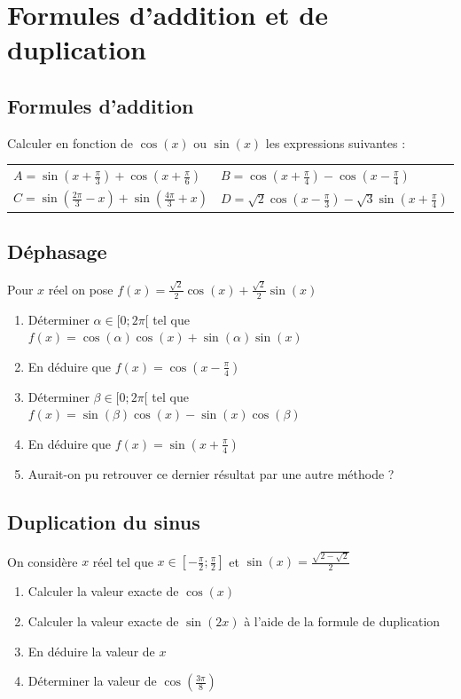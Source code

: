 \documentclass[oneside,12pt]{article}          %
\begin{document}
\section{Formules d'addition et de duplication}

\subsection{Formules d'addition}
Calculer en fonction de $\cos(x)$ ou $\sin(x)$ les expressions suivantes :

\begin{tabular}{p{} p{}}
	$A=\sin(x+\frac{\pi}{3})+\cos(x+\frac{\pi}{6})$ & $B=\cos(x+\frac{\pi}{4})-\cos(x-\frac{\pi}{4})$ \\
	$C=\sin(\frac{2\pi}{3}-x)+\sin(\frac{4\pi}{3}+x)$ & $D=\sqrt{2}\cos(x-\frac{\pi}{3})-\sqrt{3}\sin(x+\frac{\pi}{4})$
\end{tabular}



\subsection{Déphasage}
Pour $x$ réel on pose $f(x)=\frac{\sqrt{2}}{2}\cos(x)+\frac{\sqrt{2}}{2}\sin(x)$
\begin{enumerate}
	\item Déterminer $\alpha\in[0;2\pi[$ tel que $f(x)=\cos(\alpha)\cos(x)+\sin(\alpha)\sin(x)$
	\item En déduire que $f(x)=\cos\left(x-\frac{\pi}{4}\right)$
	\item Déterminer $\beta\in[0;2\pi[$ tel que $f(x)=\sin(\beta)\cos(x)-\sin(x)\cos(\beta)$
	\item En déduire que $f(x)=\sin\left(x+\frac{\pi}{4}\right)$
	\item Aurait-on pu retrouver ce dernier résultat par une autre méthode ?
\end{enumerate}



\subsection{Duplication du sinus}
On considère $x$ réel tel que $x\in [-\frac{\pi}{2};\frac{\pi}{2}]$ et $\sin(x)=\frac{\sqrt{2-\sqrt{2}}}{2}$ 
\begin{enumerate}
    \item Calculer la valeur exacte de $\cos(x)$
    \item Calculer la valeur exacte de $\sin(2x)$ à l'aide de la formule de duplication
    \item En déduire la valeur de $x$
    \item Déterminer la valeur de $\cos\left(\frac{3\pi}{8}\right)$
\end{enumerate}
\end{document}
